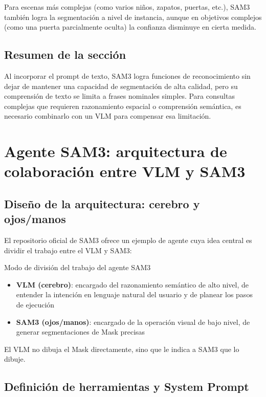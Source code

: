 \documentclass[a4paper]{article}
\begin{document}
Para escenas más complejas (como varios niños, zapatos, puertas, etc.), SAM3 también logra la segmentación a nivel de instancia, aunque en objetivos complejos (como una puerta parcialmente oculta) la confianza disminuye en cierta medida.

\subsection{Resumen de la sección}

Al incorporar el prompt de texto, SAM3 logra funciones de reconocimiento sin dejar de mantener una capacidad de segmentación de alta calidad, pero su comprensión de texto se limita a frases nominales simples. Para consultas complejas que requieren razonamiento espacial o comprensión semántica, es necesario combinarlo con un VLM para compensar esa limitación.


\section{Agente SAM3: arquitectura de colaboración entre VLM y SAM3}

\subsection{Diseño de la arquitectura: cerebro y ojos/manos}

El repositorio oficial de SAM3 ofrece un ejemplo de agente cuya idea central es dividir el trabajo entre el VLM y SAM3:

\begin{importantbox}{Modo de división del trabajo del agente SAM3}
\begin{itemize}
    \item \textbf{VLM (cerebro)}: encargado del razonamiento semántico de alto nivel, de entender la intención en lenguaje natural del usuario y de planear los pasos de ejecución
    \item \textbf{SAM3 (ojos/manos)}: encargado de la operación visual de bajo nivel, de generar segmentaciones de Mask precisas
\end{itemize}
El VLM no dibuja el Mask directamente, sino que le indica a SAM3 que lo dibuje.
\end{importantbox}

\subsection{Definición de herramientas y System Prompt}
\end{document}
